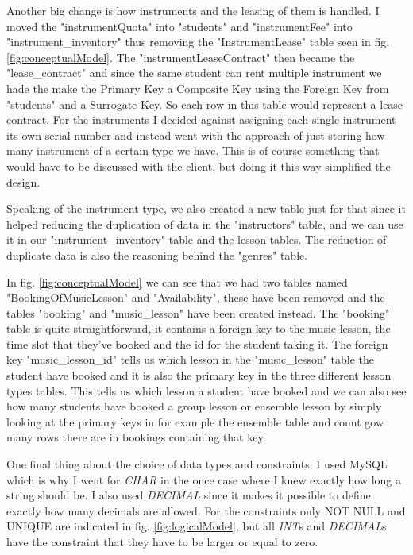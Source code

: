 \documentclass[a4paper]{scrreprt}
\begin{document}
Another big change is how instruments and the leasing of them is handled. I moved the "instrumentQuota" into "students" and "instrumentFee" into "instrument\_inventory"
thus removing the "InstrumentLease" table seen in fig. \ref{fig:conceptualModel}. The "instrumentLeaseContract" then became the "lease\_contract" and since the same 
student can rent multiple instrument we hade the make the Primary Key a Composite Key using the Foreign Key from "students" and a Surrogate Key. So each row in this
table would represent a lease contract. For the instruments I decided against assigning each single instrument its own serial number and instead went with the approach
of just storing how many instrument of a certain type we have. This is of course something that would have to be discussed with the client, but doing it this way 
simplified the design. 

Speaking of the instrument type, we also created a new table just for that since it helped reducing the duplication of data in the "instructors" table, and we can use 
it in our "instrument\_inventory" table and the lesson tables. The reduction of duplicate data is also the reasoning behind the "genres" table.

In fig. \ref{fig:conceptualModel} we can see that we had two tables named "BookingOfMusicLesson" and "Availability", these have been removed and the tables "booking"
and "music\_lesson" have been created instead. The "booking" table is quite straightforward, it contains a foreign key to the music lesson, the time slot that they've booked and the id for the student taking it.
The foreign key "music\_lesson\_id" tells us which lesson in the "music\_lesson" table the student have booked and it is also the primary key in the three different lesson types tables. This tells us 
which lesson a student have booked and we can also see how many students have booked a group lesson or ensemble lesson by simply looking at the primary keys in for example the ensemble table and count
gow many rows there are in bookings containing that key. 

One final thing about the choice of data types and constraints. I used MySQL which is why I went for \textit{CHAR} in the once case where I knew exactly how long a 
string should be. I also used \textit{DECIMAL} since it makes it possible to define exactly how many decimals are allowed. For the constraints only NOT NULL and UNIQUE
are indicated in fig. \ref{fig:logicalModel}, but all \textit{INT}s and \textit{DECIMAL}s have the constraint that they have to be larger or equal to zero.
\end{document}
